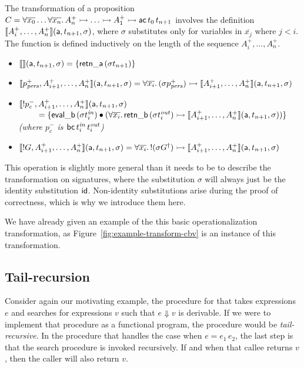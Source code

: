 The transformation of a proposition $C = \forall
\overline{x_0}\ldots \forall \overline{x_n}.\,A^+_n \rightarrowtail \ldots
\rightarrowtail A^+_1 \rightarrowtail {\sf ac}\,t_{0}\,t_{n+1}$ involves the definition
$\llbracket {A^+_i,\ldots,A^+_n} \rrbracket({\sf a},{t_{n+1}},{\sigma})$, where $\sigma$
substitutes only for variables in $\overline{x_j}$ where $j < i$. The
function is defined inductively on the length of the sequence
$A^+_i,\ldots,A^+_n$.

\begin{itemize}
\item $\llbracket {} \rrbracket({\sf a},{t_{n+1}},{\sigma}) = \{ {\sf retn\_a}\,(\sigma{t_{n+1}}) \}$
\item $\llbracket {p^+_{\it pers},A^+_{i+1},\ldots,A^+_n} \rrbracket({\sf a},{t_{n+1}},{\sigma}) 
  = \forall \overline{x_i}.\, (\sigma{p^+_{\it pers}}) \rightarrowtail \llbracket {A^+_{i+1},\ldots,A^+_n} \rrbracket({\sf a},{t_{n+1}},{\sigma})$
\item $\llbracket {{!}p^-_c,A^+_{i+1},\ldots,A^+_n} \rrbracket({\sf a},{t_{n+1}},{\sigma})$
  \\
  $~ \qquad = \{ {\sf eval\_b}\,({\sigma}t^{\it in}_i) \mathbin{\bullet}
  (\forall\overline{x_i}.\, {\sf retn\_b}\,(\sigma{t^{\it out}_i})
  \rightarrowtail \llbracket {A^+_{i+1},\ldots,A^+_n} \rrbracket({\sf a},{t_{n+1}},{\sigma})) \}$\\
  {\it (where $p^-_c$ is ${\sf bc}\,t^{\it in}_i\,t^{\it out}_i$)}
\item $\llbracket {{!}G,A^+_{i+1},\ldots,A^+_n} \rrbracket({\sf a},{t_{n+1}},{\sigma}) = \forall
  \overline{x_i}.\, {!}(\sigma{{G}^\dag}) \rightarrowtail
  \llbracket {A^+_{i+1},\ldots,A^+_n} \rrbracket({\sf a},{t_{n+1}},{\sigma})$
\end{itemize}

\noindent
This operation is slightly more general than it needs to be to
describe the transformation on signatures, where the substitution
$\sigma$ will always just be the identity substitution ${\sf id}$.
Non-identity substitutions arise during the proof of correctness, which
is why we introduce them here.

We have already given an example of the this basic operationalization
transformation, as Figure~\ref{fig:example-transform-cbv} is an
instance of this transformation.

\subsection{Tail-recursion}
\label{sec:trans-tail}

Consider again our motivating example, the procedure for that takes
expressions $e$ and searches for expressions $v$ such that $e
\Downarrow v$ is derivable. If we were to implement that procedure as
a functional program, the procedure would be {\it tail-recursive}. In
the procedure that handles the case when $e = e_1\,e_2$, the last step
is that the search procedure is invoked recursively. If and when that
callee returns $v$, then the caller will also return $v$.

